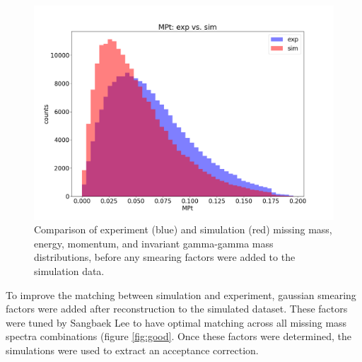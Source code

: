\begin{figure}[hbt]
	\includegraphics[page=135,width=0.3\linewidth]{Chapters/Ch3-Simulations/pics/nosmear/outbending_rad_All_All_All_no_smearingMPt_exp_vs_sim.png}
	
	\caption{Comparison of experiment (blue) and simulation (red) missing mass, energy, momentum, and invariant gamma-gamma mass distributions, before any smearing factors were added to the simulation data.}
	\label{fig:bad}
\end{figure}



To improve the matching between simulation and experiment, gaussian smearing factors were added after reconstruction to the simulated dataset. These factors were tuned by Sangbaek Lee to have optimal matching across all missing mass spectra combinations (figure \ref{fig:good}. Once these factors were determined, the simulations were used to extract an acceptance correction.


